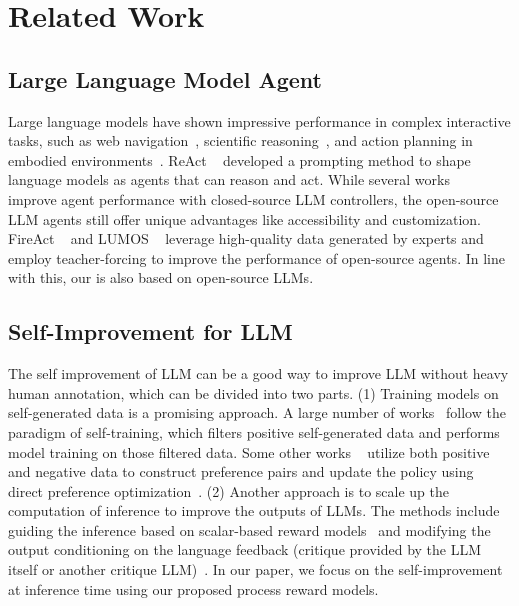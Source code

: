 \section{Related Work}
\subsection{Large Language Model Agent}
Large language models have shown impressive performance in complex interactive tasks, such as web navigation~\citep{yao2022webshop}, scientific reasoning~\citep{wang2022scienceworld}, and action planning in embodied environments~\citep{shridhar2021alfworld}.  ReAct ~\citep{yao2023react} developed a prompting method to shape language models as agents that can reason and act. While several works ~\citep{shen2024hugginggpt,song2023restgpt} improve agent performance with closed-source LLM controllers, the open-source LLM agents still offer unique advantages like accessibility and customization. FireAct ~\citep{chen2023fireact} and LUMOS ~\citep{yin2024lumos} leverage high-quality data generated by experts and employ teacher-forcing to improve the performance of open-source agents. In line with this, our {\ours} is also based on open-source LLMs.


\subsection{Self-Improvement for LLM}
The self improvement of LLM can be a good way to improve LLM without heavy human annotation, which can be divided into two parts.
(1) Training models on self-generated data is a promising approach. A large number of works~\citep{dou2024re-rest,wang2022learning,yuan2023RFT,singh2023rest-em, gulcehre2023rest, math-shepherd} follow the paradigm of self-training, which filters positive self-generated data and performs model training on those filtered data. Some other works ~\citep{song-etal-2024-eto,setlur2024-8fold} utilize both positive and negative data to construct preference pairs and update the policy using direct preference optimization~\citep{rafailov2024direct}. 
(2) Another approach is to scale up the computation of inference to improve the outputs of LLMs. The methods include guiding the inference based on scalar-based reward models~\citep{wang2024q*, xu2022universal, zhai2024enhancing} and modifying the output conditioning on the language feedback (critique provided by the LLM itself or another critique LLM)~\citep{zhou2024language, wu2024vdebugger, shinn2023reflexion}. 
In our paper, we focus on the self-improvement at inference time using our proposed process reward models.

